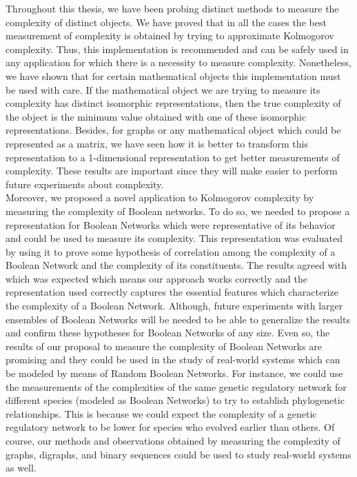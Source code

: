 Throughout this thesis, we have been probing distinct methods to measure the complexity of distinct objects. We have proved that in all the cases the best measurement of complexity is obtained by trying to approximate Kolmogorov complexity. Thus, this implementation is recommended and can be safely used in any application for which there is a necessity to measure complexity. Nonetheless, we have shown that for certain mathematical objects this implementation must be used with care. If the mathematical object we are trying to measure its complexity has distinct isomorphic representations, then the true complexity of the object is the minimum value obtained with one of these isomorphic representations. Besides, for graphs or any mathematical object which could be represented as a matrix, we have seen how it is better to transform this representation to a 1-dimensional representation to get better measurements of complexity. These results are important since they will make easier to perform future experiments about complexity.\\

Moreover, we proposed a novel application to Kolmogorov complexity by measuring the complexity of Boolean networks. To do so, we needed to propose a representation for Boolean Networks which were representative of its behavior and could be used to measure its complexity. This representation was evaluated by using it to prove some hypothesis of correlation among the complexity of a Boolean Network and the complexity of its constituents. The results agreed with which was expected which means our approach works correctly and the representation used correctly captures the essential features which characterize the complexity of a Boolean Network. Although, future experiments with larger ensembles of Boolean Networks will be needed to be able to generalize the results and confirm these hypotheses for Boolean Networks of any size. Even so, the results of our proposal to measure the complexity of Boolean Networks are promising and they could be used in the study of real-world systems which can be modeled by means of Random Boolean Networks. For instance, we could use the measurements of the complexities of the same genetic regulatory network for different species (modeled as Boolean Networks) to try to establish phylogenetic relationships. This is because we could expect the complexity of a genetic regulatory network to be lower for species who evolved earlier than others. Of course, our methods and observations obtained by measuring the complexity of graphs, digraphs, and binary sequences could be used to study real-world systems as well.\\

